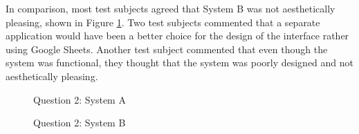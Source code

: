 In comparison, most test subjects agreed that System B was not aesthetically pleasing, shown in Figure \ref{fig:finalQ2Kaizen}. Two test subjects commented that a separate application would have been a better choice for the design of the interface rather using Google Sheets. Another test subject commented that even though the system was functional, they thought that the system was poorly designed and not aesthetically pleasing.

\begin{figure}[!h]
  \centering
  \begin{minipage}[b]{0.47\textwidth}
    \caption{Question 2: System A}
    \label{fig:finalQ2Bioschemas}
  \end{minipage}
  \hfill
  \begin{minipage}[b]{0.47\textwidth}
    \caption{Question 2: System B}
    \label{fig:finalQ2Kaizen}
  \end{minipage}
\end{figure}


